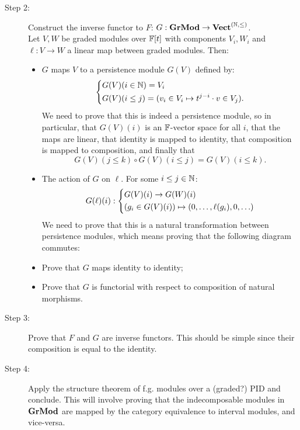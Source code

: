 \begin{description}
	\item[Step 2:] Construct the inverse functor to $F$: $G : {\normalfont\textbf{GrMod}} \rightarrow {\normalfont\textbf{Vect}}^{(\mathbb{N}, \leq)}$. \\
		\noindent Let $V, W$ be graded modules over $\mathbb{F}[t]$ with components $V_i, W_i$ and $\ell : V \rightarrow W$ a linear map between graded modules. Then: 
		\begin{itemize}
			\item $G$ maps $V$ to a persistence module $G(V)$ defined by: 
			\begin{equation*}
				\begin{dcases}
					G(V) (i \in \mathbb{N}) = V_i \\
					G(V) (i \leq j) = (v_i \in V_i \mapsto t^{j-i} \cdot v \in V_j).
				\end{dcases}
			\end{equation*}
			We need to prove that this is indeed a persistence module, so in particular, that $G(V)(i)$ is an $\mathbb{F}$-vector space for all $i$, that the maps are linear, that identity is mapped to identity, that composition is mapped to composition, and finally that 
			\begin{equation*}
				G(V) (j \leq k) \circ G(V) (i \leq j) = G(V) (i \leq k).
			\end{equation*}
			\item The action of $G$ on $\ell$. For some $i \leq j \in \mathbb{N}$:
			\begin{equation*}
				G (\ell) (i) : 
				\begin{dcases}
					G(V) (i) \rightarrow G(W) (i) \\
					(g_i \in G(V)(i)) \mapsto (0, \ldots, \ell (g_i), 0, \ldots)
				\end{dcases}
			\end{equation*}
			We need to prove that this is a natural transformation between persistence modules, which means proving that the following diagram commutes: \\
			\begin{center}
			\end{center}
			\item Prove that $G$ maps identity to identity;
			\item Prove that $G$ is functorial with respect to composition of natural morphisms.  
		\end{itemize}
	\item[Step 3:] Prove that $F$ and $G$ are inverse functors. This should be simple since their composition is equal to the identity. 
	\item[Step 4:] Apply the structure theorem of f.g. modules over a (graded?) PID and conclude. This will involve proving that the indecomposable modules in ${\normalfont\textbf{GrMod}}$ are mapped by the category equivalence to interval modules, and vice-versa. 
\end{description}
